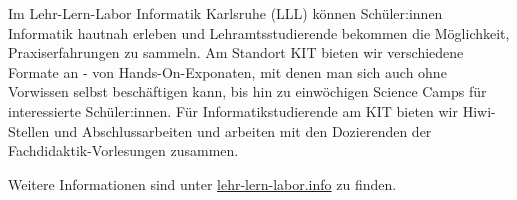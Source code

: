 Im Lehr-Lern-Labor Informatik Karlsruhe (LLL) können Schüler:innen Informatik hautnah erleben und Lehramtsstudierende bekommen die Möglichkeit, Praxiserfahrungen zu sammeln. Am Standort KIT bieten wir verschiedene Formate an - von Hands-On-Exponaten, mit denen man sich auch ohne Vorwissen selbst beschäftigen kann, bis hin zu einwöchigen Science Camps für interessierte Schüler:innen. Für Informatikstudierende am KIT bieten wir Hiwi-Stellen und Abschlussarbeiten und arbeiten mit den Dozierenden der Fachdidaktik-Vorlesungen zusammen.

Weitere Informationen sind unter \href{http://lehr-lern-labor.info}{lehr-lern-labor.info} zu finden.
